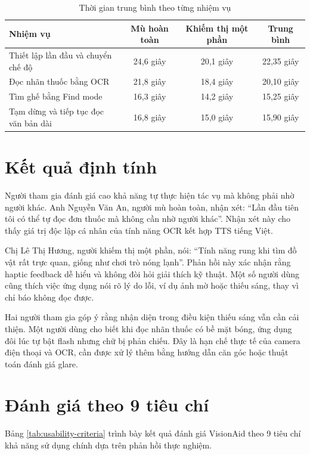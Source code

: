\documentclass[a4paper,13pt]{report}
\begin{document}
\begin{table}[H]
\centering
\caption{Thời gian trung bình theo từng nhiệm vụ}
\label{tab:task-time}
\begin{tabularx}{\textwidth}{Xccc}
\toprule
\textbf{Nhiệm vụ} & \textbf{Mù hoàn toàn} & \textbf{Khiếm thị một phần} & \textbf{Trung bình} \\
\midrule
Thiết lập lần đầu và chuyển chế độ & 24,6 giây & 20,1 giây & 22,35 giây \\
Đọc nhãn thuốc bằng OCR & 21,8 giây & 18,4 giây & 20,10 giây \\
Tìm ghế bằng Find mode & 16,3 giây & 14,2 giây & 15,25 giây \\

Tạm dừng và tiếp tục đọc văn bản dài & 16,8 giây & 15,0 giây & 15,90 giây \\
\bottomrule
\end{tabularx}
\end{table}

\section{Kết quả định tính}

Người tham gia đánh giá cao khả năng tự thực hiện tác vụ mà không phải nhờ người khác. Anh Nguyễn Văn An, người mù hoàn toàn, nhận xét: ``Lần đầu tiên tôi có thể tự đọc đơn thuốc mà không cần nhờ người khác''. Nhận xét này cho thấy giá trị độc lập cá nhân của tính năng OCR kết hợp TTS tiếng Việt.

Chị Lê Thị Hương, người khiếm thị một phần, nói: ``Tính năng rung khi tìm đồ vật rất trực quan, giống như chơi trò nóng lạnh''. Phản hồi này xác nhận rằng haptic feedback dễ hiểu và không đòi hỏi giải thích kỹ thuật. Một số người dùng cũng thích việc ứng dụng nói rõ lý do lỗi, ví dụ ảnh mờ hoặc thiếu sáng, thay vì chỉ báo không đọc được.

Hai người tham gia góp ý rằng nhận diện trong điều kiện thiếu sáng vẫn cần cải thiện. Một người dùng cho biết khi đọc nhãn thuốc có bề mặt bóng, ứng dụng đôi lúc tự bật flash nhưng chữ bị phản chiếu. Đây là hạn chế thực tế của camera điện thoại và OCR, cần được xử lý thêm bằng hướng dẫn căn góc hoặc thuật toán đánh giá glare.

\section{Đánh giá theo 9 tiêu chí}

Bảng \ref{tab:usability-criteria} trình bày kết quả đánh giá VisionAid theo 9 tiêu chí khả năng sử dụng chính dựa trên phản hồi thực nghiệm.
\end{document}
